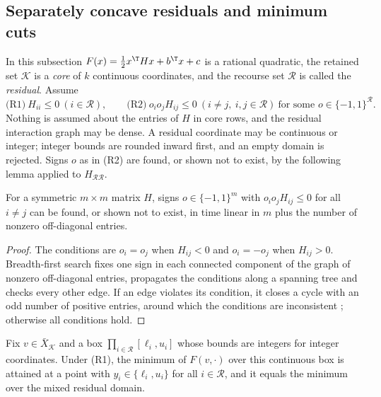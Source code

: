 \subsection{Separately concave residuals and minimum cuts}\label{sec:cuts}

In this subsection $F(x)=\frac12x^{\T}Hx+b^{\T}x+c$ is a rational quadratic,
the retained set $\mathcal K$ is a \emph{core} of $k$ continuous
coordinates, and the recourse set $\mathcal R$ is called the
\emph{residual}. Assume
\begin{equation}\label{eq:cr-class}
\text{(R1)}\ H_{ii}\le0\ (i\in\mathcal R),\qquad
\text{(R2)}\ o_io_jH_{ij}\le0\ (i\ne j,\ i,j\in\mathcal R)\ \text{for some }
o\in\{-1,1\}^{\mathcal R}.
\end{equation}
Nothing is assumed about the entries of $H$ in core rows, and the residual
interaction graph may be dense. A residual coordinate may be continuous or
integer; integer bounds are rounded inward first, and an empty domain is
rejected. Signs $o$ as in (R2) are found, or shown not to exist, by the
following lemma applied to $H_{\mathcal R\mathcal R}$.

\begin{lemma}\label{lem:balance}
For a symmetric $m\times m$ matrix $H$, signs $o\in\{-1,1\}^m$ with
$o_io_jH_{ij}\le0$ for all $i\ne j$ can be found, or shown not to exist, in
time linear in $m$ plus the number of nonzero off-diagonal entries.
\end{lemma}

\begin{proof}
The conditions are $o_i=o_j$ when $H_{ij}<0$ and $o_i=-o_j$ when
$H_{ij}>0$. Breadth-first search fixes one sign in each connected component
of the graph of nonzero off-diagonal entries, propagates the conditions
along a spanning tree and checks every other edge. If an edge violates its
condition, it closes a cycle with an odd number of positive entries, around
which the conditions are inconsistent \cite{Harary1953}; otherwise all
conditions hold.
\end{proof}

\begin{lemma}\label{lem:cr-endpoint}
Fix $v\in\bar X_{\mathcal K}$ and a box $\prod_{i\in\mathcal R}[\ell_i,u_i]$
whose bounds are integers for integer coordinates. Under (R1), the minimum
of $F(v,\cdot)$ over this continuous box is attained at a point with
$y_i\in\{\ell_i,u_i\}$ for all $i\in\mathcal R$, and it equals the minimum
over the mixed residual domain.
\end{lemma}

